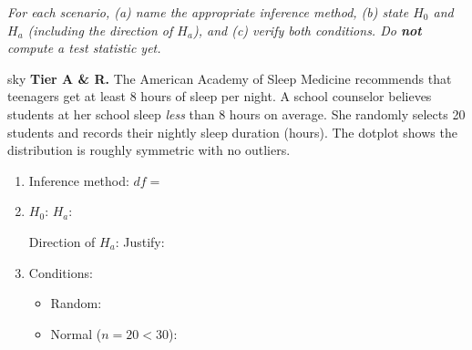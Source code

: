 \documentclass[10pt]{article}
\begin{document}
\namepartnerperiod

\vspace{0.15in}

\textit{For each scenario, (a) name the appropriate inference method, (b) state $H_0$ and
$H_a$ (including the direction of $H_a$), and (c) verify both conditions. Do \textbf{not}
compute a test statistic yet.}

\begin{scenariobox}{sky}
\textbf{Tier A \& R.} \quad
The American Academy of Sleep Medicine recommends that teenagers get at least 8 hours of sleep
per night. A school counselor believes students at her school sleep \emph{less} than 8 hours
on average. She randomly selects 20 students and records their nightly sleep duration (hours).
The dotplot shows the distribution is roughly symmetric with no outliers.

\begin{enumerate}[label=\alph*.]
  \item Inference method:  \quad $df = $ 
  \item $H_0$:  \quad $H_a$: 

        Direction of $H_a$:  \quad Justify: 

  \item Conditions:
        \begin{itemize}
          \item Random: 
          \item Normal ($n = 20 < 30$): 
        \end{itemize}
\end{enumerate}
\end{scenariobox}
\end{document}
